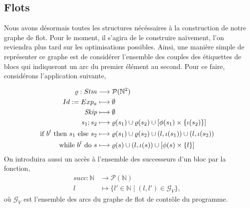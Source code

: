 \subsection{Flots}
Nous avons désormais toutes les structures nécéssaires à la construction de notre graphe de flot. Pour le moment, il s'agira de 
le construire naïvement, l'on reviendra plus tard sur les optimisations possibles. Ainsi, une manière simple de représenter ce 
graphe est de considérer l'ensemble des couples des étiquettes de blocs qui indiqueront un arc du premier élément au second. 
Pour ce faire, considérons l'application suivante, 

\begin{align*}
	\varrho : Stm &\longrightarrow \mathcal{P}(\mathbb{N}^2) \\
	{Id}\space:=\space{Exp_a} &\longmapsto \emptyset \\
	\textit{Skip} &\longmapsto \emptyset \\
	{s_1}\space;\space{s_2} &\longmapsto \varrho(s_1) \cup \varrho(s_2) \cup [\phi(s_1)\times\{\iota(s_2)\}] \\
	\text{if }{b^l}\text{ then }{s_1}\text{ else }{s_2} &\longmapsto \varrho(s_1)\cup\varrho(s_2)\cup(l, \iota(s_1))\cup(l, \iota(s_2)) \\
	\text{while }{b^l}\text{ do }{s} &\longmapsto \varrho(s)\cup(l,\iota(s))\cup[\phi(s)\times\{l\}]
\end{align*}
On introduira aussi un accès à l'ensemble des successeurs d'un bloc par la fonction,
\begin{align*}
	succ : \mathbb{N} &\longrightarrow \mathcal{P}(\mathbb{N})\\
	l &\longmapsto \{l' \in \mathbb{N} \mid (l, l') \in \mathcal{G}_V\},
\end{align*}
où $\mathcal{G}_V$ est l'ensemble des arcs du graphe de flot de contrôle du programme.